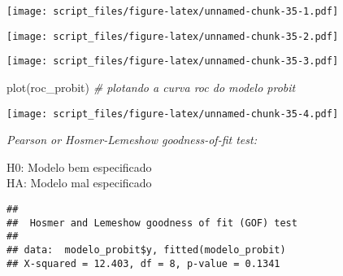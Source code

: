 \documentclass[
]{article}
\newenvironment{Shaded}{\begin{snugshade}}{\end{snugshade}}
\newcommand{\AttributeTok}[1]{\textcolor[rgb]{0.77,0.63,0.00}{#1}}
\newcommand{\CommentTok}[1]{\textcolor[rgb]{0.56,0.35,0.01}{\textit{#1}}}
\newcommand{\DecValTok}[1]{\textcolor[rgb]{0.00,0.00,0.81}{#1}}
\newcommand{\FunctionTok}[1]{\textcolor[rgb]{0.00,0.00,0.00}{#1}}
\newcommand{\NormalTok}[1]{#1}
\newcommand{\SpecialCharTok}[1]{\textcolor[rgb]{0.00,0.00,0.00}{#1}}
\begin{document}
\texttt{[image: script\_files/figure-latex/unnamed-chunk-35-1.pdf]}

\begin{Shaded}
\end{Shaded}

\texttt{[image: script\_files/figure-latex/unnamed-chunk-35-2.pdf]}

\begin{Shaded}
\end{Shaded}

\texttt{[image: script\_files/figure-latex/unnamed-chunk-35-3.pdf]}

\begin{Shaded}
\begin{Highlighting}[]
\FunctionTok{plot}\NormalTok{(roc\_probit) }\CommentTok{\# plotando a curva roc do modelo probit}
\end{Highlighting}
\end{Shaded}

\texttt{[image: script\_files/figure-latex/unnamed-chunk-35-4.pdf]}

\emph{Pearson or Hosmer-Lemeshow goodness-of-fit test:}

H0: Modelo bem especificado\\
HA: Modelo mal especificado

\begin{Shaded}
\end{Shaded}

\begin{verbatim}
## 
##  Hosmer and Lemeshow goodness of fit (GOF) test
## 
## data:  modelo_probit$y, fitted(modelo_probit)
## X-squared = 12.403, df = 8, p-value = 0.1341
\end{verbatim}
\end{document}
